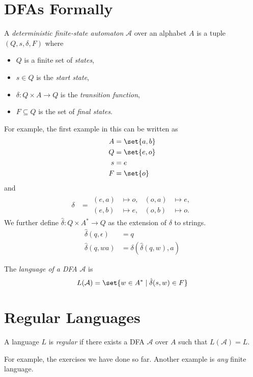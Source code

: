 \section{DFAs Formally} \label{sec:dfa:formal}
\begin{definition}[DFA] \label{def:dfa}
    A \emph{deterministic finite-state automaton} $\mathcal{A}$ over an
    alphabet $A$ is a tuple $(Q, s, \delta, F)$ where
    \begin{itemize}
        \item $Q$ is a finite set of \emph{states},
        \item $s \in Q$ is the \emph{start state},
        \item $\delta: Q \times A \to Q$ is the \emph{transition function},
        \item $F \subseteq Q$ is the set of \emph{final states}.
    \end{itemize}
\end{definition}
For example, the first example in this  can be written as
\begin{align*}
    A &= \set{a, b} \\
    Q &= \set{e, o} \\
    s &= e \\
    F &= \set{o}
\end{align*} and \begin{align*}
    \delta &= \begin{aligned}
        (e, a) &\mapsto o, & (o, a) &\mapsto e, \\
        (e, b) &\mapsto e, & (o, b) &\mapsto o.
    \end{aligned}
\end{align*}
We further define $\hat{\delta} : Q \times A^* \to Q$ as the extension of
$\delta$ to strings.
\begin{align*}
    \hat{\delta}(q, \epsilon) &= q \\
    \hat{\delta}(q, wa) &= \delta(\hat{\delta}(q, w), a)
\end{align*}
\begin{definition} \label{def:dfa:lang}
    The \emph{language of a DFA} $\mathcal{A}$ is
    \begin{equation*}
        L(\mathcal{A}) = \set{w \in A^* \mid \hat{\delta}(s, w) \in F}
    \end{equation*}
\end{definition}

\section{Regular Languages} \label{sec:dfa:regular}
\vspace{1em}
\begin{definition} \label{def:regular}
    A language $L$ is \emph{regular} if there exists a DFA $\mathcal{A}$
    over $A$ such that $L(\mathcal{A}) = L$.
\end{definition}
For example, the exercises we have done so far.
Another example is \emph{any} finite language.


